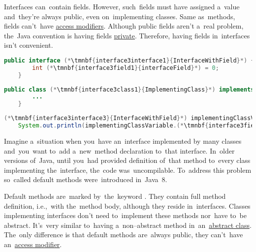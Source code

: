 \noindent Interfaces can~contain fields.
However, such~fields must have assigned a~value and~they're always public, even on~implementing classes.
Same as~methods, fields can't~have \hyperref[javaaccessmodofiers]{access modifiers}.
Although public fields aren't a~real problem, the~Java convention is having fields \hyperref[javaprivate]{private}.
Therefore, having fields in~interfaces isn't convenient.

\emtwen
{}%
\begin{lstlisting}[language=Java, title={Interface with field}]
    public interface (*\tmnbf{interface3interface1}{InterfaceWithField}*) {
        int (*\tmnbf{interface3field1}{interfaceField}*) = 0;
    }
\end{lstlisting}
\begin{lstlisting}[language=Java, title={Implementing class}]
    public class (*\tmnbf{interface3class1}{ImplementingClass}*) implements (*\tmnbf{interface3interface2}{InterfaceWithField}*) {
        ...
    }
\end{lstlisting}
\begin{lstlisting}[language=Java, title={Usage}]
    (*\tmnbf{interface3interface3}{InterfaceWithField}*) implementingClassVariable = new (*\tmnbf{interface3class2}{ImplementingClass}*)();
    System.out.println(implementingClassVariable.(*\tmnbf{interface3field2}{interfaceField}*));
\end{lstlisting}
\newpage

Imagine a~situation when you~have an~interface implemented by many classes and~you~want to~add a~new~method declaration to~that interface.
In~older versions of~Java, until you~had provided definition of~that method to~every class implementing the~interface, the~code was~uncompilable.
To~address this problem so~called default methods were~introduced in~Java~8.

Default methods are~marked by~the~keyword .
They contain full method definition, i.e.,~with the~method body, although they reside in~interfaces.
Classes implementing interfaces don't need to~implement these methods nor~have to~be abstract.
It's~very similar to~having a~non--abstract method in~an~\hyperref[javaabstractclasses]{abstract class}.
The~only difference is that default methods are~always public, they can't~have an~\hyperref[javaaccessmodifiers]{access modifier}.


